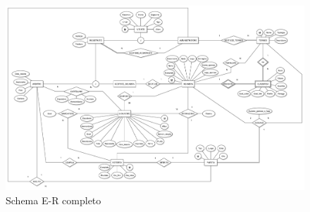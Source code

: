 \begin{figure}[h]
	\centering
	\includegraphics[height=1\textwidth,
	angle=90]
	{immagini/diagramma-ER-completo}
	
	\caption{Schema E-R completo}
	
	\label{fig-modello-ER}
\end{figure}	